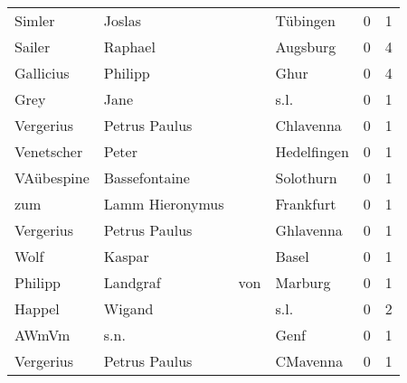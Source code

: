 \begin{center}
\begin{tiny}
\begin{longtabu}{llllrr}
                   Simler &                             Joslas &             &                                    Tübingen &          0 &         1 \\
                   Sailer &                            Raphael &             &                                    Augsburg &          0 &         4 \\
                Gallicius &                            Philipp &             &                                        Ghur &          0 &         4 \\
                     Grey &                               Jane &             &                                        s.l. &          0 &         1 \\
                Vergerius &                      Petrus Paulus &             &                                   Chlavenna &          0 &         1 \\
               Venetscher &                              Peter &             &                                 Hedelfingen &          0 &         1 \\
               VAübespine &                      Bassefontaine &             &                                   Solothurn &          0 &         1 \\
                      zum &                    Lamm Hieronymus &             &                                   Frankfurt &          0 &         1 \\
                Vergerius &                      Petrus Paulus &             &                                   Ghlavenna &          0 &         1 \\
                     Wolf &                             Kaspar &             &                                       Basel &          0 &         1 \\
                  Philipp &                           Landgraf &         von &                                     Marburg &          0 &         1 \\
                   Happel &                             Wigand &             &                                        s.l. &          0 &         2 \\
                    AWmVm &                               s.n. &             &                                        Genf &          0 &         1 \\
                Vergerius &                      Petrus Paulus &             &                                    CMavenna &          0 &         1 \\

\end{longtabu}
\end{tiny}
\end{center}
